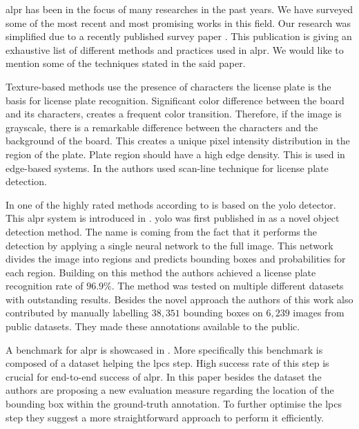 

\ac{alpr} has been in the focus of many researches in the past years.
We have surveyed some of the most recent and most promising works in this field.
Our research was simplified due to a recently published survey paper \cite{survOnMet}.
This publication is giving an exhaustive list of different methods and practices used in \ac{alpr}.
We would like to mention some of the techniques stated in the said paper.


Texture-based methods use the presence of characters the license plate is the basis for license plate recognition. Significant color difference between the board and its characters, creates a frequent color transition. Therefore, if the image is grayscale, there is a remarkable difference between the characters and the background of the board. This creates a unique pixel intensity distribution in the region of the plate. Plate region should have a high edge density. This is used in edge-based systems. In \cite{HongFuJiaHuan} the authors used scan-line technique for license plate detection.



In one of the highly rated methods according to \cite{survOnMet} is based on the
\ac{yolo} detector.  This \ac{alpr} system is introduced in
\cite{DBLP:journals/corr/abs-1909-01754}. \ac{yolo} was first published in
\cite{redmon2016look} as a novel object detection method.  The name is coming
from the fact that it performs the detection by applying a single neural network
to the full image.  This network divides the image into regions and predicts
bounding boxes and probabilities for each region.  Building on this method the
authors achieved a license plate recognition rate of $96.9\%$.  The method was
tested on multiple different datasets with outstanding results.  Besides the
novel approach the authors of this work also contributed by manually labelling
$38,351$ bounding boxes on $6,239$ images from public datasets.  They made these
annotations available to the public.

A benchmark for \ac{alpr} is showcased in \cite{DBLP:journals/corr/GoncalvesSMS16}. More specifically this benchmark is composed of a dataset helping the \ac{lpcs} step. High success rate of this step is crucial for end-to-end success of \ac{alpr}. In this paper besides the dataset the authors are proposing a new evaluation measure regarding the location of the bounding box within the ground-truth annotation. To further optimise the \ac{lpcs} step they suggest a more straightforward approach to perform it efficiently.









